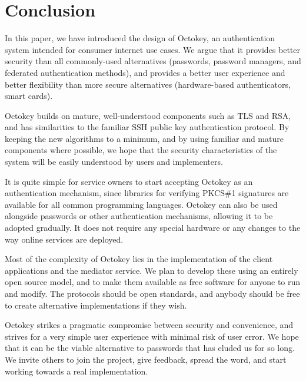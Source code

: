 \section{Conclusion}

In this paper, we have introduced the design of Octokey, an authentication system intended for
consumer internet use cases. We argue that it provides better security than all commonly-used
alternatives (passwords, password managers, and federated authentication methods), and provides a
better user experience and better flexibility than more secure alternatives (hardware-based
authenticators, smart cards).

Octokey builds on mature, well-understood components such as TLS and RSA, and has similarities to
the familiar SSH public key authentication protocol. By keeping the new algorithms to a minimum, and
by using familiar and mature components where possible, we hope that the security characteristics of
the system will be easily understood by users and implementers.

It is quite simple for service owners to start accepting Octokey as an authentication mechanism,
since libraries for verifying PKCS\#1 signatures are available for all common programming languages.
Octokey can also be used alongside passwords or other authentication mechanisms, allowing it to be
adopted gradually. It does not require any special hardware or any changes to the way online
services are deployed.

Most of the complexity of Octokey lies in the implementation of the client applications and the
mediator service. We plan to develop these using an entirely open source model, and to make them
available as free software for anyone to run and modify. The protocols should be open standards, and
anybody should be free to create alternative implementations if they wish.

Octokey strikes a pragmatic compromise between security and convenience, and strives for a very
simple user experience with minimal risk of user error. We hope that it can be the viable
alternative to passwords that has eluded us for so long. We invite others to join the project, give
feedback, spread the word, and start working towards a real implementation.
